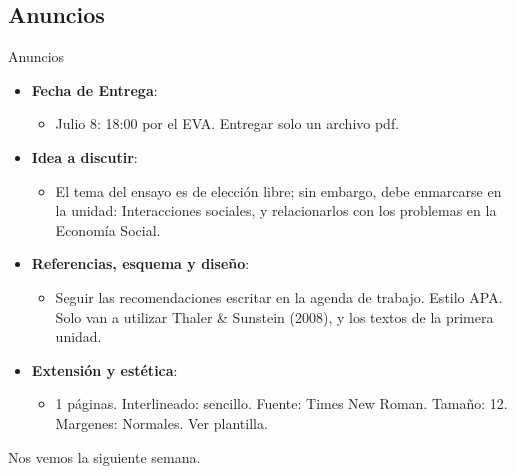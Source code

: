 \documentclass[11pt, aspectratio=169, compress]{beamer}
\makeatletter
\def\beamer@writeslidentry@miniframesoff{%
	\expandafter\beamer@ifempty\expandafter{\beamer@framestartpage}{}%
	{%
		\clearpage\beamer@notesactions%
	}
}
\newcommand*{\miniframesoff}{\let\beamer@writeslidentry=\beamer@writeslidentry@miniframesoff}
\makeatother
\begin{document}
\subsection{Anuncios}
\begin{frame}{Anuncios}
\begin{itemize}
	\item \textbf{Fecha de Entrega}: 
	\begin{itemize}
		\item Julio 8: 18:00 por el EVA. Entregar solo un archivo pdf. 
	\end{itemize}
	\item \textbf{Idea a discutir}: 
	\begin{itemize}
		\item El tema del ensayo es de elección libre; sin embargo, debe enmarcarse en la unidad: Interacciones sociales, y relacionarlos con los problemas en la Economía Social. 
	\end{itemize}
	\item \textbf{Referencias, esquema y diseño}: 
	\begin{itemize}
		\item Seguir las recomendaciones escritar en la agenda de trabajo. Estilo APA. Solo van a utilizar Thaler \& Sunstein (2008), y los textos de la primera unidad. 
	\end{itemize}
	\item \textbf{Extensión y estética}: 
	\begin{itemize}
		\item 1 páginas. Interlineado: sencillo. Fuente: Times New Roman. Tamaño: 12. Margenes: Normales. Ver plantilla. 
	\end{itemize}
\end{itemize}
\end{frame}
\miniframesoff 	
\begin{frame}
Nos vemos la siguiente semana. 
\end{frame}
\end{document}
